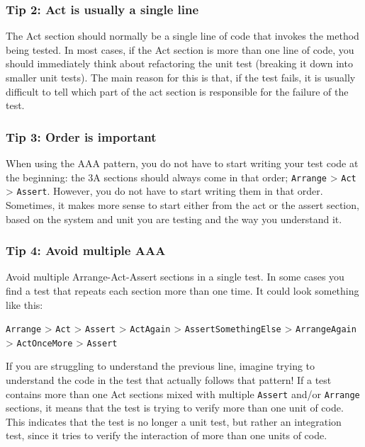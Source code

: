 \documentclass[
]{book}
\begin{document}
\hypertarget{singleline}{%
\subsubsection{Tip 2: Act is usually a single line}\label{singleline}}

The Act section should normally be a single line of code that invokes the method being tested. In most cases, if the Act section is more than one line of code, you should immediately think about refactoring the unit test (breaking it down into smaller unit tests). The main reason for this is that, if the test fails, it is usually difficult to tell which part of the act section is responsible for the failure of the test.

\hypertarget{ordering}{%
\subsubsection{Tip 3: Order is important}\label{ordering}}

When using the AAA pattern, you do not have to start writing your test code at the beginning: the 3A sections should always come in that order; \texttt{Arrange} \textgreater{} \texttt{Act} \textgreater{} \texttt{Assert}. However, you do not have to start writing them in that order. Sometimes, it makes more sense to start either from the act or the assert section, based on the system and unit you are testing and the way you understand it.

\hypertarget{multipleaaa}{%
\subsubsection{Tip 4: Avoid multiple AAA}\label{multipleaaa}}

Avoid multiple Arrange-Act-Assert sections in a single test. In some cases you find a test that repeats each section more than one time. It could look something like this:

\texttt{Arrange} \textgreater{} \texttt{Act} \textgreater{} \texttt{Assert} \textgreater{} \texttt{ActAgain} \textgreater{} \texttt{AssertSomethingElse} \textgreater{} \texttt{ArrangeAgain} \textgreater{} \texttt{ActOnceMore} \textgreater{} \texttt{Assert}

If you are struggling to understand the previous line, imagine trying to understand the code in the test that actually follows that pattern! If a test contains more than one Act sections mixed with multiple \texttt{Assert} and/or \texttt{Arrange} sections, it means that the test is trying to verify more than one unit of code. This indicates that the test is no longer a unit test, but rather an integration test, since it tries to verify the interaction of more than one units of code.
\end{document}
